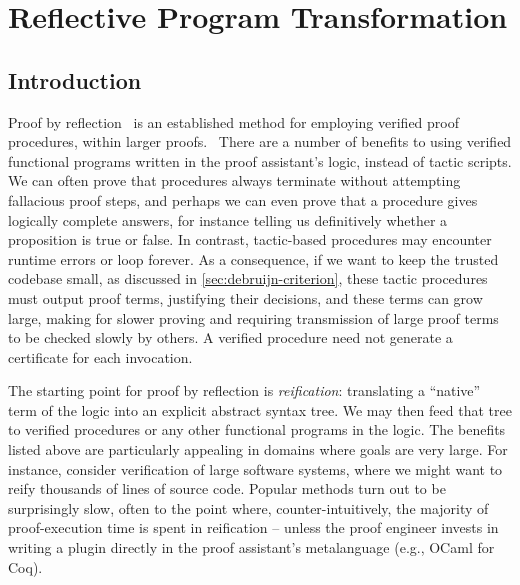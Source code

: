 \chapter{Reflective Program Transformation}\label{ch:reflection}

\section{Introduction} \label{sec:reification-by-parametricity:intro}


Proof by reflection~\cite{ReflectionTACS97} is an established method for employing verified proof procedures, within larger proofs.~\cite{MirrorShardITP14,malecha2013mirror-shard,Speeding2017Malecha,gonthier2016small}
There are a number of benefits to using verified functional programs written in the proof assistant's logic, instead of tactic scripts.
We can often prove that procedures always terminate without attempting fallacious proof steps, and perhaps we can even prove that a procedure gives logically complete answers, for instance telling us definitively whether a proposition is true or false.
In contrast, tactic-based procedures may encounter runtime errors or loop forever.
As a consequence, if we want to keep the trusted codebase small, as discussed in \autoref{sec:debruijn-criterion}, these tactic procedures must output proof terms, justifying their decisions, and these terms can grow large, making for slower proving and requiring transmission of large proof terms to be checked slowly by others.
A verified procedure need not generate a certificate for each invocation.

The starting point for proof by reflection is \emph{reification}: translating a ``native'' term of the logic into an explicit abstract syntax tree.
We may then feed that tree to verified procedures or any other functional programs in the logic.
The benefits listed above are particularly appealing in domains where goals are very large.
For instance, consider verification of large software systems, where we might want to reify thousands of lines of source code.
Popular methods turn out to be surprisingly slow, often to the point where, counter-intuitively, the majority of proof-execution time is spent in reification -- unless the proof engineer invests in writing a plugin directly in the proof assistant's metalanguage (e.g., OCaml for Coq).

